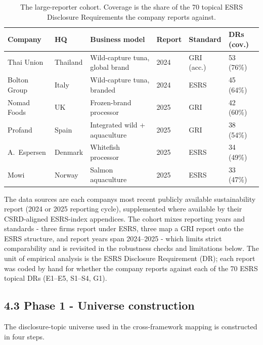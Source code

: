 \documentclass[
]{article}
\begin{document}
\begin{table}[ht]
\centering\footnotesize
\caption{The large-reporter cohort. Coverage is the share of the 70
topical ESRS Disclosure Requirements the company reports against.}
\label{tab:cohort}
\begin{tabular}{@{}llp{4.4cm}lll@{}}
\toprule
Company & HQ & Business model & Report & Standard & DRs (cov.) \\
\midrule
Thai Union & Thailand & Wild-capture tuna, global brand & 2024 & GRI (acc.) & 53 (76\%) \\
Bolton Group & Italy & Wild-capture tuna, branded & 2024 & ESRS & 45 (64\%) \\
Nomad Foods & UK & Frozen-brand processor & 2025 & GRI & 42 (60\%) \\
Profand & Spain & Integrated wild + aquaculture & 2025 & GRI & 38 (54\%) \\
A.~Espersen & Denmark & Whitefish processor & 2025 & ESRS & 34 (49\%) \\
Mowi & Norway & Salmon aquaculture & 2025 & ESRS & 33 (47\%) \\
\bottomrule
\end{tabular}
\end{table}

The data sources are each company\textquotesingle s most recent publicly
available sustainability report (2024 or 2025 reporting cycle),
supplemented where available by their CSRD-aligned ESRS-index appendices.
The cohort mixes reporting years and standards - three firms report
under ESRS, three map a GRI report onto the ESRS structure, and report
years span 2024--2025 - which limits strict comparability and is
revisited in the robustness checks and limitations below. The unit of
empirical analysis is the ESRS Disclosure Requirement (DR); each report
was coded by hand for whether the company reports against each of the 70
ESRS topical DRs (E1--E5, S1--S4, G1).

\subsection{4.3 Phase 1 - Universe
construction}\label{phase-1---universe-construction}

The disclosure-topic universe used in the cross-framework mapping is
constructed in four steps.
\end{document}
